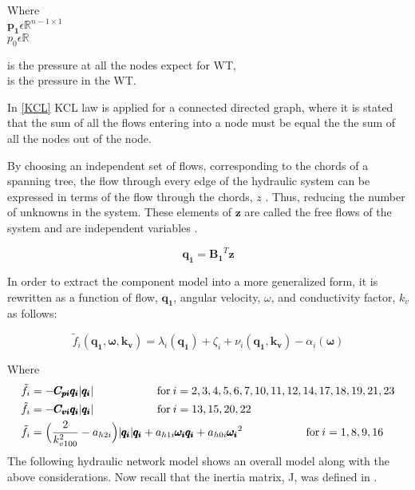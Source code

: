 \begin{minipage}[t]{0.20\textwidth}
Where\\
\hspace*{8mm} $\pmb{p_1} \epsilon \mathbb{R}^{n-1 \times 1}$  \\
\hspace*{8mm} $p_0 \epsilon \mathbb{R} $ 
\end{minipage}
\begin{minipage}[t]{0.68\textwidth}
\vspace*{2mm}
\hspace*{4mm} is the pressure at all the nodes expect for WT,\\
\hspace*{4mm} is the pressure in the WT.
\end{minipage}

In \eqref{KCL} KCL law is applied for a connected directed graph, where it is stated that the sum of all the flows entering 
into a node must be equal the the sum of all the nodes out of the node.

By choosing an independent set of flows, corresponding to the chords of a spanning tree, the 
flow through every edge of the hydraulic system can be expressed in terms of the flow through the chords, $z$ \cite{GraphModel}.
Thus, reducing the number of unknowns in the system. These elements of $\pmb{z}$ are called the free 
flows of the system and are independent variables \cite{GraphTheoryCarsten}.

\begin{equation}
  \pmb{q_1} = \pmb{B_1} ^{T}  \pmb{z}
  \label{ChordRelation}
\end{equation}

In order to extract the component model into a more generalized form, it is rewritten as a function of flow, $\pmb{q_1}$, angular velocity, $\omega$, and conductivity factor, $k_v$ as follows:

\begin{equation}
  \tilde{f}_i(\pmb{q_1}, \pmb{\omega}, \pmb{k_v}) = \lambda_i(\pmb{q_1}) + \zeta_i + \nu_i(\pmb{q_1}, \pmb{k_v}) - \alpha_i(\pmb{\omega})
  \label{ComponentFunction}
\end{equation}

Where\\
\begin{align}
\tilde{f}_i &= -\pmb{C_{pi} q_i} |\pmb{q_i}|  \hskip 2cm  \text{for}\: i = 2,3,4,5,6,7,10,11,12,14,17,18,19,21,23 \\
\tilde{f}_i &= -\pmb{C_{vi} q_i} |\pmb{q_i}|  \hskip 2cm  \text{for}\:i = 13,15,20,22\\
\tilde{f}_i &= \Big(\frac{2}{k_{v100}^2} - a_{h2i}\Big)|\pmb{q_i}| \pmb{q_i}  + a_{h1i} \pmb{\omega_{i}} \pmb{q_i} + a_{h0i}\pmb{{\omega_i}}^2 \hskip 2cm  \text{for}\: i = 1,8,9,16
\end{align}
The following hydraulic network model shows an overall model along with the above considerations. 
Now recall that the inertia matrix, J, was defined in .

